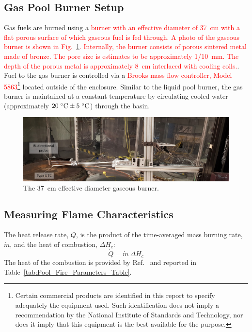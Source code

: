 \documentclass[12pt]{article}
\begin{document}
\subsection{Gas Pool Burner Setup}
\label{ssec:Gas_Pool_Burner_Setup}
Gas fuels are burned using a \textcolor{red}{burner with an effective diameter of 37~cm with a flat porous surface of which gaseous fuel is fed through. A photo of the gaseous burner is shown in Fig.~\ref{fig:Gas_Pool_Burner}. Internally, the burner consists of porous sintered metal made of bronze. The pore size is estimates to be approximately 1/10~mm. The depth of the porous metal is approximately 8~cm interlaced with cooling coils.}. Fuel to the gas burner is controlled via a \textcolor{red}{Brooks mass flow controller, Model 5863}\footnote{\label{fn:product} Certain commercial products are identified in this report to specify adequately the equipment used. Such identification does not imply a recommendation by the National Institute of Standards and Technology, nor does it imply that this equipment is the best available for the purpose.} located outside of the enclosure. Similar to the liquid pool burner, the gas burner is maintained at a constant temperature by circulating cooled water (approximately $20 \; ^\circ \hbox{C} \pm 5 \; ^\circ \hbox{C}$) through the basin.

\begin{figure}[h!]
	\centering
\includegraphics[width=\textwidth,keepaspectratio]{Gas_Burner_2.jpg}
	\caption[Photograph of the gaseous burner]{The 37~cm effective diameter gaseous burner.}
	\label{fig:Gas_Pool_Burner}
\end{figure}

\subsection{Measuring Flame Characteristics}
\label{ssec:Flame_Characteristics_Measurements}

The heat release rate, $\dot{Q}$, is the product of the time-averaged mass burning rate, $\dot{m}$, and the heat of combustion, $\Delta H_{c}$:
\begin{equation}\label{eq:Heat_release_rate}
\dot{Q}= \dot{m}~\Delta H_{c}
\end{equation}
The heat of the combustion is provided by Ref.~\cite{Dippr} and reported in Table~\ref{tab:Pool_Fire_Parameters_Table}.
\end{document}
